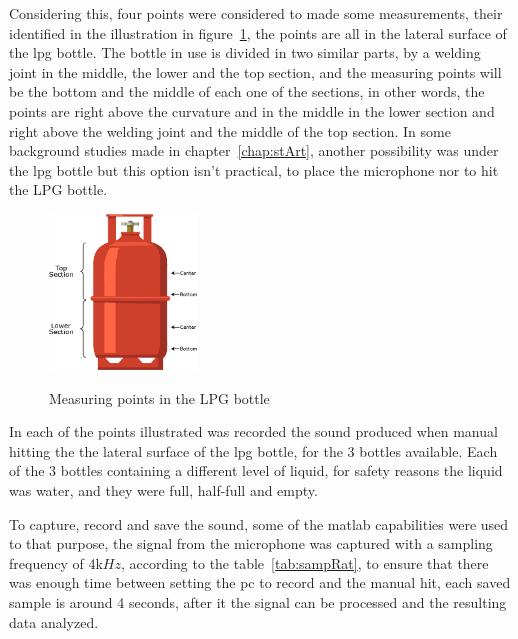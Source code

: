 Considering this, four points were considered to made some measurements, their identified in the illustration in figure~\ref{fig:measPointMic}, the points are all in the lateral surface of the \acrshort{lpg} bottle. The bottle in use is divided in two similar parts, by a welding joint in the middle, the lower and the top section, and the measuring points will be the bottom and the middle of each one of the sections, in other words, the points are right above the curvature and in the middle in the lower section and right above the welding joint and the middle of the top section. In some background studies made in chapter~\ref{chap:stArt}, another possibility was under the \acrshort{lpg} bottle but this option isn't practical, to place the microphone nor to hit the LPG bottle.
\begin{figure}[]
    \centering
    \includegraphics[width=0.35\textwidth]{Chapters/6CHP/Figures/measuringPointsMic.eps}
    \caption{Measuring points in the LPG bottle}{}
    \label{fig:measPointMic}
\end{figure}
In each of the points illustrated was recorded the sound produced when manual hitting the the lateral surface of the \acrshort{lpg} bottle, for the 3 bottles available. Each of the 3 bottles containing a different level of liquid, for safety reasons the liquid was water, and they were full, half-full and empty. 

To capture, record and save the sound, some of the \acrshort{matlab} capabilities were used to that purpose, the signal from the microphone was captured with a sampling frequency of 4k$Hz$, according to the table~\ref{tab:sampRat}, to ensure that there was enough time between setting the \acrshort{pc} to record and the manual hit, each saved sample is around 4 seconds, after it the signal can be processed and the resulting data analyzed.
